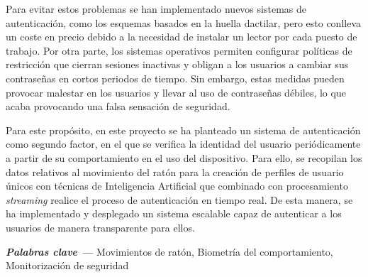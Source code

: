 Para evitar estos problemas se han implementado nuevos sistemas de autenticación, como los esquemas basados en la huella dactilar, pero esto conlleva un coste en precio debido a la necesidad de instalar un lector por cada puesto de trabajo. Por otra parte, los sistemas operativos permiten configurar políticas de restricción que cierran sesiones inactivas y obligan a los usuarios a cambiar sus contraseñas en cortos periodos de tiempo. Sin embargo, estas medidas pueden provocar malestar en los usuarios y llevar al uso de contraseñas débiles, lo que acaba provocando una falsa sensación de seguridad.


Para este propósito, en este proyecto se ha planteado un sistema de autenticación como segundo factor, en el que se verifica la identidad del usuario periódicamente a partir de su comportamiento en el uso del dispositivo. Para ello, se recopilan los datos relativos al movimiento del ratón para la creación de perfiles de usuario únicos con técnicas de Inteligencia Artificial que combinado con procesamiento \textit{streaming} realice el proceso de autenticación en tiempo real.  De esta manera, se ha implementado y desplegado un sistema escalable capaz de autenticar a los usuarios de manera transparente para ellos.


{\vspace{5mm}\textbf{\textit{Palabras clave ---}}
Movimientos de ratón,
Biometría del comportamiento,
Monitorización de seguridad
}
